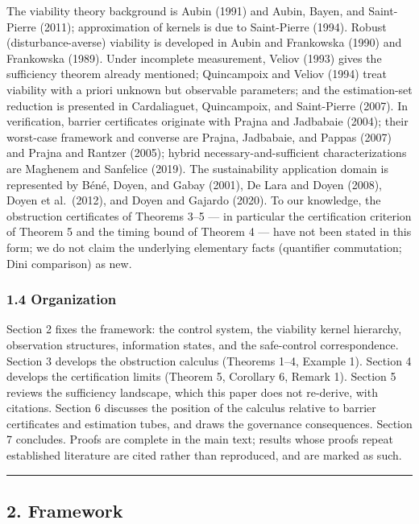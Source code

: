 \documentclass[11pt]{article}
\begin{document}
The viability theory background is Aubin (1991) and Aubin, Bayen, and
Saint-Pierre (2011); approximation of kernels is due to Saint-Pierre
(1994). Robust (disturbance-averse) viability is developed in Aubin and
Frankowska (1990) and Frankowska (1989). Under incomplete measurement,
Veliov (1993) gives the sufficiency theorem already mentioned;
Quincampoix and Veliov (1994) treat viability with a priori unknown but
observable parameters; and the estimation-set reduction is presented in
Cardaliaguet, Quincampoix, and Saint-Pierre (2007). In verification,
barrier certificates originate with Prajna and Jadbabaie (2004); their
worst-case framework and converse are Prajna, Jadbabaie, and Pappas
(2007) and Prajna and Rantzer (2005); hybrid necessary-and-sufficient
characterizations are Maghenem and Sanfelice (2019). The sustainability
application domain is represented by B\'en\'e, Doyen, and Gabay (2001), De
Lara and Doyen (2008), Doyen et al.~(2012), and Doyen and Gajardo
(2020). To our knowledge, the obstruction certificates of Theorems 3--5
--- in particular the certification criterion of Theorem 5 and the
timing bound of Theorem 4 --- have not been stated in this form; we do
not claim the underlying elementary facts (quantifier commutation; Dini
comparison) as new.

\subsubsection{1.4 Organization}\label{organization}

Section 2 fixes the framework: the control system, the viability kernel
hierarchy, observation structures, information states, and the
safe-control correspondence. Section 3 develops the obstruction calculus
(Theorems 1--4, Example 1). Section 4 develops the certification limits
(Theorem 5, Corollary 6, Remark 1). Section 5 reviews the sufficiency
landscape, which this paper does not re-derive, with citations. Section
6 discusses the position of the calculus relative to barrier
certificates and estimation tubes, and draws the governance
consequences. Section 7 concludes. Proofs are complete in the main text;
results whose proofs repeat established literature are cited rather than
reproduced, and are marked as such.

\begin{center}\rule{0.5\linewidth}{0.5pt}\end{center}

\subsection{2. Framework}\label{framework}
\end{document}

